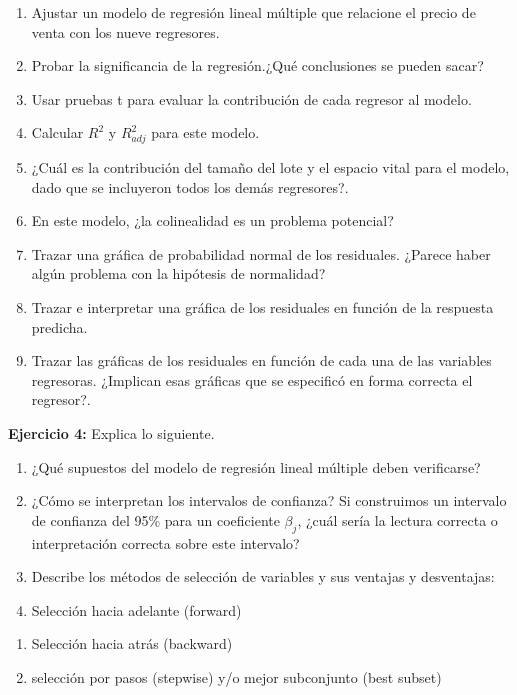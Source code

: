 \documentclass[
]{book}
\begin{document}
\begin{enumerate}
\def\labelenumi{\alph{enumi})}
\item
  Ajustar un modelo de regresión lineal múltiple que relacione el precio de venta con los nueve regresores.
\item
  Probar la significancia de la regresión.¿Qué conclusiones se pueden sacar?
\item
  Usar pruebas t para evaluar la contribución de cada regresor al modelo.
\item
  Calcular \(R^2\) y \(R^2_{adj}\) para este modelo.
\item
  ¿Cuál es la contribución del tamaño del lote y el espacio vital para el modelo, dado que se incluyeron todos los demás regresores?.
\item
  En este modelo, ¿la colinealidad es un problema potencial?
\item
  Trazar una gráfica de probabilidad normal de los residuales. ¿Parece haber algún problema con la hipótesis de normalidad?
\item
  Trazar e interpretar una gráfica de los residuales en función de la respuesta predicha.
\item
  Trazar las gráficas de los residuales en función de cada una de las variables regresoras. ¿Implican esas gráficas que se especificó en forma correcta el regresor?.
\end{enumerate}

\textbf{Ejercicio 4:} Explica lo siguiente.

\begin{enumerate}
\def\labelenumi{\alph{enumi})}
\item
  ¿Qué supuestos del modelo de regresión lineal múltiple deben verificarse?
\item
  ¿Cómo se interpretan los intervalos de confianza? Si construimos un intervalo de confianza del 95\% para un coeficiente \(\beta_j\), ¿cuál sería la lectura correcta o interpretación correcta sobre este intervalo?
\item
  Describe los métodos de selección de variables y sus ventajas y desventajas:
\item
  Selección hacia adelante (forward)
\end{enumerate}

\begin{enumerate}
\def\labelenumi{\roman{enumi})}
\setcounter{enumi}{1}
\item
  Selección hacia atrás (backward)
\item
  selección por pasos (stepwise) y/o mejor subconjunto (best subset)
\end{enumerate}
\end{document}
